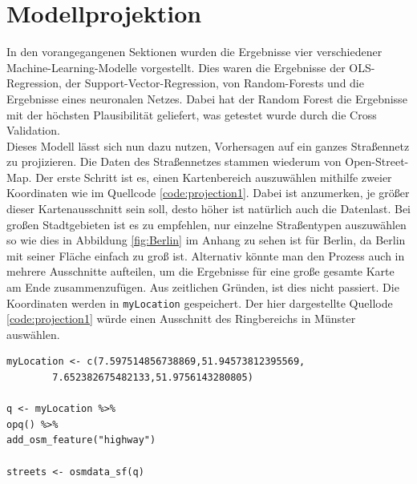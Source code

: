 \documentclass[a4paper,12pt]{thesis}
\begin{document}
\section{Modellprojektion}

In den vorangegangenen Sektionen wurden die Ergebnisse vier verschiedener Machine-Learning-Modelle vorgestellt. Dies waren die Ergebnisse der OLS-Regression, der Support-Vector-Regression, von Random-Forests und die Ergebnisse eines neuronalen Netzes. Dabei hat der Random Forest die Ergebnisse mit der höchsten Plausibilität geliefert, was getestet wurde durch die Cross Validation.\\
Dieses Modell lässt sich nun dazu nutzen, Vorhersagen auf ein ganzes Straßennetz zu projizieren. Die Daten des Straßennetzes stammen wiederum von Open-Street-Map. Der erste Schritt ist es, einen Kartenbereich auszuwählen mithilfe zweier Koordinaten wie im Quellcode \ref{code:projection1}. Dabei ist anzumerken, je größer dieser Kartenausschnitt sein soll, desto höher ist natürlich auch die Datenlast. Bei großen Stadtgebieten ist es zu empfehlen, nur einzelne Straßentypen auszuwählen so wie dies in Abbildung \ref{fig:Berlin} im Anhang zu sehen ist für Berlin, da Berlin mit seiner Fläche einfach zu groß ist. Alternativ könnte man den Prozess auch in mehrere Ausschnitte aufteilen, um die Ergebnisse für eine große gesamte Karte am Ende zusammenzufügen. Aus zeitlichen Gründen, ist dies nicht passiert. Die Koordinaten werden in \lstinline|myLocation| gespeichert. Der hier dargestellte Quellode \ref{code:projection1} würde einen Ausschnitt des Ringbereichs in Münster auswählen.

\begin{minipage}{\linewidth}
\begin{lstlisting}[caption={Wahl des Kartenausschnitts},label=code:projection1]
myLocation <- c(7.597514856738869,51.94573812395569,   
		7.652382675482133,51.9756143280805)
		
q <- myLocation %>% 
opq() %>%
add_osm_feature("highway")

streets <- osmdata_sf(q)
\end{lstlisting}
\end{minipage}
\end{document}
